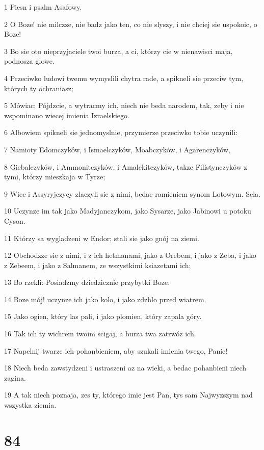 \par 1 Piesn i psalm Asafowy.
\par 2 O Boze! nie milczze, nie badz jako ten, co nie slyszy, i nie chciej sie uspokoic, o Boze!
\par 3 Bo sie oto nieprzyjaciele twoi burza, a ci, którzy cie w nienawisci maja, podnosza glowe.
\par 4 Przeciwko ludowi twemu wymyslili chytra rade, a spikneli sie przeciw tym, których ty ochraniasz;
\par 5 Mówiac: Pójdzcie, a wytracmy ich, niech nie beda narodem, tak, zeby i nie wspominano wiecej imienia Izraelskiego.
\par 6 Albowiem spikneli sie jednomyslnie, przymierze przeciwko tobie uczynili:
\par 7 Namioty Edomczyków, i Ismaelczyków, Moabczyków, i Agarenczyków,
\par 8 Giebalczyków, i Ammonitczyków, i Amalekitczyków, takze Filistynczyków z tymi, którzy mieszkaja w Tyrze;
\par 9 Wiec i Assyryjczycy zlaczyli sie z nimi, bedac ramieniem synom Lotowym. Sela.
\par 10 Uczynze im tak jako Madyjanczykom, jako Sysarze, jako Jabinowi u potoku Cyson.
\par 11 Którzy sa wygladzeni w Endor; stali sie jako gnój na ziemi.
\par 12 Obchodzze sie z nimi, i z ich hetmanami, jako z Orebem, i jako z Zeba, i jako z Zebeem, i jako z Salmanem, ze wszystkimi ksiazetami ich;
\par 13 Bo rzekli: Posiadzmy dziedzicznie przybytki Boze.
\par 14 Boze mój! uczynze ich jako kolo, i jako zdzblo przed wiatrem.
\par 15 Jako ogien, który las pali, i jako plomien, który zapala góry.
\par 16 Tak ich ty wichrem twoim scigaj, a burza twa zatrwóz ich.
\par 17 Napelnij twarze ich pohanbieniem, aby szukali imienia twego, Panie!
\par 18 Niech beda zawstydzeni i ustraszeni az na wieki, a bedac pohanbieni niech zagina.
\par 19 A tak niech poznaja, zes ty, którego imie jest Pan, tys sam Najwyzszym nad wszystka ziemia.

\chapter{84}

